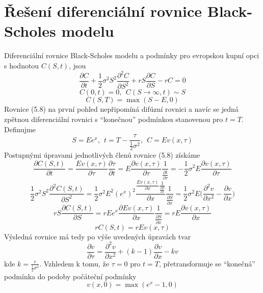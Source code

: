 \documentclass[a4paper]{book}
\begin{document}
\section{Řešení diferenciální rovnice Black-Scholes modelu}

Diferenciální rovnice Black-Scholes modelu a podmínky pro evropskou kupní opci s hodnotou $C(S,t)$, jsou
\begin{equation}
\frac{\partial C}{\partial t} + \frac{1}{2}\sigma^2S^2\frac{\partial^2 C}{\partial S^2} + rS \frac{\partial C}{\partial S} - rC = 0
\end{equation}
\begin{equation*}
C(0,t) = 0, ~~ C(S \rightarrow \infty,t) \sim S
\end{equation*}
\begin{equation*}
C(S,T) = \max(S-E,0)
\end{equation*}
Rovnice (5.8) na první pohled nepřipomíná difúzní rovnici a navíc se jedná zpětnou diferenciální rovnici s ``konečnou'' podmínkou stanovenou pro $t = T$. Definujme
\begin{equation*}
S = Ee^x, ~~ t = T - \frac{\tau}{\frac{1}{2}\sigma^2}, ~~ C = Ev(x, \tau)
\end{equation*}
Postupnými úpravami jednotlivých členů rovnice (5.8) získáme
\begin{equation*}
\frac{\partial C(S,t)}{\partial t} = \frac{Ev(x, \tau)}{\partial \tau}\frac{\partial \tau}{\partial t} = E \frac{\partial v(x,\tau)}{\partial \tau} \frac{1}{\frac{\partial t}{\partial \tau}} = -\frac{1}{2}\sigma^2 E \frac{\partial v(x, \tau)}{\partial \tau}
\end{equation*}
\begin{equation*}
\frac{1}{2}\sigma^2 S^2 \frac{\partial^2 C(S,t)}{\partial S^2} = \frac{1}{2}\sigma^2 E^2 ( e^x)^2 \frac{\frac{E v(x, \tau)}{\partial x} \frac{1}{\frac{\partial S}{\partial x}}}{\partial x} \frac{1}{\frac{\partial S}{\partial x}} = \frac{1}{2}\sigma^2E \bigg( \frac{\partial^2 v}{\partial x^2} - \frac{\partial v}{\partial x} \bigg)
\end{equation*}
\begin{equation*}
rS\frac{\partial C(S,t)}{\partial S} = r E e^x \frac{\partial E v(x,\tau)}{\partial x} \frac{1}{\frac{\partial S}{\partial x}} = r E \frac{\partial v(x, \tau)}{\partial x}
\end{equation*}
\begin{equation*}
rC(S,t) = rEv(x, \tau)
\end{equation*}
Výsledná rovnice má tedy po výše uvedených úpravách tvar
\begin{equation}
\frac{\partial v}{\partial \tau} = \frac{\partial^2 v}{\partial x^2} + (k - 1)\frac{\partial v}{\partial x} - kv
\end{equation}
kde $k = \frac{r}{\frac{1}{2}\sigma^2}$. Vzhledem k tomu, že $\tau = 0$ pro $t = T$, přetransformuje se ``konečná'' podmínka do podoby počáteční podmínky
\begin{equation*}
v(x,0) = \max(e^x - 1,0)
\end{equation*}
\end{document}
